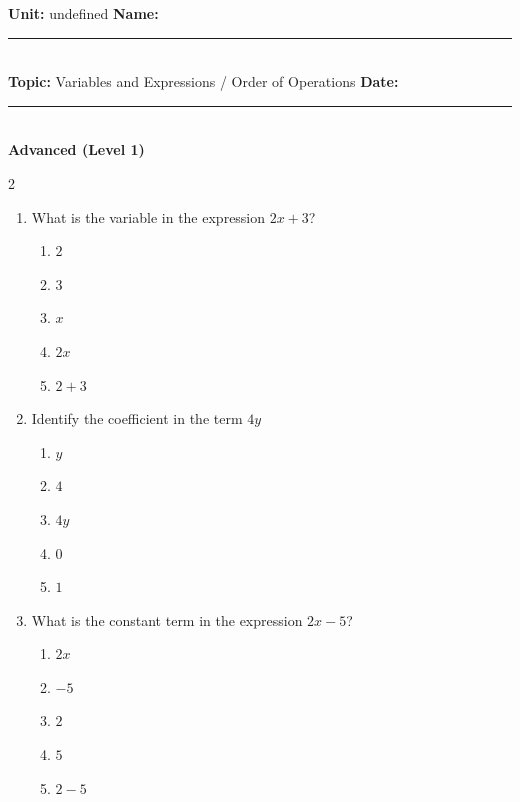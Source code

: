 \documentclass[10pt]{article}
\begin{document}
\enlargethispage{2.5cm}

\begin{tcolorbox}[colback=mainblue!5, colframe=mainblue, sharp corners, boxrule=0.5pt]
    \small \textbf{Unit:} undefined \hfill \textbf{Name:} \rule{3cm}{0.4pt} \\
    \small \textbf{Topic:} Variables and Expressions / Order of Operations \hfill \textbf{Date:} \rule{2cm}{0.4pt} \\
    \centering \textbf{\large Advanced (Level 1)}
\end{tcolorbox}

\vspace{0.2cm}

\begin{multicols}{2}
\begin{enumerate}[label=\textbf{Q\arabic*.}, leftmargin=*, itemsep=6pt, parsep=0pt]

  \item \small What is the variable in the expression $2x + 3$?
  \begin{enumerate}[label=(\Alph*), leftmargin=0.6cm, nosep, itemsep=2pt]
    \item $2$
    \item $3$
    \item $x$
    \item $2x$
    \item $2 + 3$
  \end{enumerate}

  \item \small Identify the coefficient in the term $4y$
  \begin{enumerate}[label=(\Alph*), leftmargin=0.6cm, nosep, itemsep=2pt]
    \item $y$
    \item $4$
    \item $4y$
    \item $0$
    \item $1$
  \end{enumerate}

  \item \small What is the constant term in the expression $2x - 5$?
  \begin{enumerate}[label=(\Alph*), leftmargin=0.6cm, nosep, itemsep=2pt]
    \item $2x$
    \item $-5$
    \item $2$
    \item $5$
    \item $2 - 5$
  \end{enumerate}


\end{enumerate}
\end{multicols}
\end{document}
